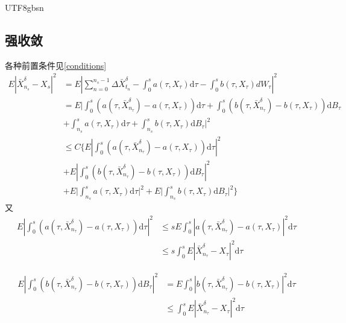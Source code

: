 \documentclass{article}
\begin{document}
\begin{CJK*}{UTF8}{gbsn}
\subsection{强收敛}
各种前置条件见\ref{conditions}
$$
\begin{aligned}
E\left|\bar{X}_{n_{s}}^{\delta}-X_{s}\right|^{2}
&=E\left|\sum_{n=0}^{n_{s}-1}\Delta\bar{X}_{t_n}^{\delta}-\int_{0}^{s}a\left(\tau,X_{\tau}\right)\mathrm{d}\tau-\int_{0}^{s}b\left(\tau,X_{\tau}\right)dW_{\tau}\right|^2 \\
&=E\Bigg|\int_{0}^{s}\left(a(\tau,\bar{X}_{n_\tau}^{\delta})-a(\tau,X_{\tau})\right)\mathrm{d}\tau+\int_{0}^{s}\left(b(\tau,\bar{X}_{n_\tau}^{\delta})-b(\tau,X_{\tau})\right)\mathrm{d}B_{\tau}\\
&+\int_{n_{s}}^{s}a(\tau,X_{\tau})\mathrm{d}\tau+\int_{n_{s}}^{s}b(\tau,X_{\tau})\mathrm{d}B_{\tau}\Bigg|^{2} \\
&\le C\Bigg\{
E\left|\int_{0}^{s}\left(a(\tau,\bar{X}_{n_\tau}^{\delta})-a(\tau,X_{\tau})\right)\mathrm{d}\tau\right|^2\\
&+E\left|\int_{0}^{s}\left(b(\tau,\bar{X}_{n_\tau}^{\delta})-b(\tau,X_{\tau})\right)\mathrm{d}B_\tau\right|^2\\
&+E\Bigg|\int_{n_{s}}^{s}a(\tau,X_{\tau})\mathrm{d}\tau\Bigg|^{2} +E\Bigg|\int_{n_{s}}^{s}b(\tau,X_{\tau})\mathrm{d}B_{\tau}\Bigg|^{2} 
\Bigg\}
\end{aligned}
$$
又
$$\begin{aligned}
E\left|\int_{0}^{s}\left(a(\tau,\bar{X}_{n_\tau}^{\delta})-a(\tau,X_{\tau})\right)\mathrm{d}\tau\right|^2
&\le sE\int_0^s\left|a(\tau,\bar{X}_{n_\tau}^{\delta})-a(\tau,X_{\tau})\right|^2\mathrm{d}\tau\\
&\le
s\int_0^sE\left|\bar{X}_{n_\tau}^{\delta}-X_{\tau}\right|^2\mathrm{d}\tau
\end{aligned}$$

$$\begin{aligned}
E\left|\int_{0}^{s}\left(b(\tau,\bar{X}_{n_\tau}^{\delta})-b(\tau,X_{\tau})\right)\mathrm{d}B_\tau\right|^2
&=
E\int_0^s\left|b(\tau,\bar{X}_{n_\tau}^{\delta})-b(\tau,X_{\tau})\right|^2\mathrm{d}\tau\\
&\le
\int_0^sE\left|\bar{X}_{n_\tau}^{\delta}-X_{\tau}\right|^2\mathrm{d}\tau
\end{aligned}$$


\end{CJK*}
\end{document}

